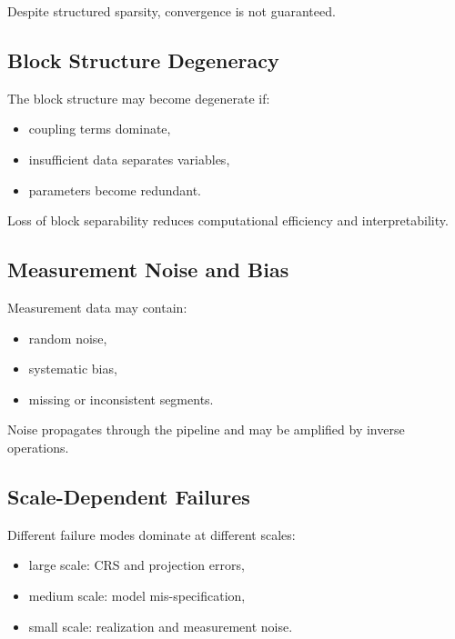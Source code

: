 Despite structured sparsity, convergence is not guaranteed.


\subsection{Block Structure Degeneracy}

The block structure may become degenerate if:
\begin{itemize}
\item coupling terms dominate,
\item insufficient data separates variables,
\item parameters become redundant.
\end{itemize}

\begin{proposition}
Loss of block separability reduces computational efficiency and
interpretability.
\end{proposition}


\subsection{Measurement Noise and Bias}

Measurement data may contain:
\begin{itemize}
\item random noise,
\item systematic bias,
\item missing or inconsistent segments.
\end{itemize}

\begin{proposition}
Noise propagates through the pipeline and may be amplified by inverse
operations.
\end{proposition}


\subsection{Scale-Dependent Failures}

Different failure modes dominate at different scales:
\begin{itemize}
\item large scale: CRS and projection errors,
\item medium scale: model mis-specification,
\item small scale: realization and measurement noise.
\end{itemize}


